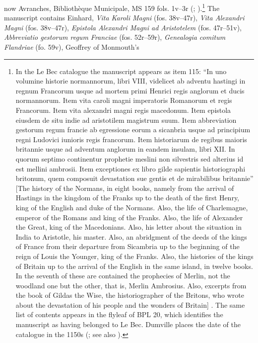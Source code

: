 \documentclass{article}
\begin{document}
now Avranches, Bibliothèque Municipale, MS 159 fols. 1v--3r (\cite[190--205]{pohl_monastic_2017}; \cite[2--4]{dumville_early_1985}).\footnote{In the Le Bec catalogue the
  manuscript appears as item 115: ``In uno volumine historie
  normannorum, libri VIII, videlicet ab adventu hastingi in regnum
  Francorum usque ad mortem primi Henrici regis anglorum et ducis
  normannorum. Item vita caroli magni imperatoris Romanorum et regis
  Francorum. Item vita alexandri magni regis macedonum. Item epistola
  eiusdem de situ indie ad aristotilem magistrum suum. Item abbreviation
  gestorum regum francie ab egressione eorum a sicanbria usque ad
  principium regni Ludovici iunioris regis francorum. Item historiarum
  de regibus maioris britannie usque ad adventum anglorum in eandem
  insulam, libri XII. In quorum septimo continentur prophetie meslini
  non silvestris sed alterius id est mellini ambrosii. Item exceptiones
  ex libro gilde sapientis historiographi britonum, quem composuit
  devastation sue gentis et de mirabilibus britannie'' [The history of the Normans, in eight books, namely from the arrival of Hastings in the kingdom of the Franks up to the death of the first Henry, king of the English and duke of the Normans. Also, the life of Charlemagne, emperor of the Romans and king of the Franks. Also, the life of Alexander the Great, king of the Macedonians. Also, his letter about the situation in India to Aristotle, his master. Also, an abridgment of the deeds of the kings of France from their departure from Sicambria up to the beginning of the reign of Louis the Younger, king of the Franks. Also, the histories of the kings of Britain up to the arrival of the English in the same island, in twelve books. In the seventh of these are contained the prophecies of Merlin, not the woodland one but the other, that is, Merlin Ambrosius. Also, excerpts from the book of Gildas the Wise, the historiographer of the Britons, who wrote about the devastation of his people and the wonders of Britain] \citep[203; my translation]{pohl_monastic_2017}. The same list of contents appears in the flyleaf of BPL 20,
  which identifies the manuscript as having belonged to Le Bec. Dumville
  places the date of the catalogue in the 1150s (\cite[3]{dumville_early_1985}; see
  also \cite[45--47]{rouse_potens_1991}).} The manuscript contains Einhard,
\emph{Vita Karoli Magni} (fos. 38v--47r), \emph{Vita Alexandri Magni}
(fos. 38v--47r), \emph{Epistola Alexandri Magni ad Aristotelem} (fos.
47r--51v), \emph{Abbreviatio gestorum regum Franciae} (fos. 52r--59r),
\emph{Genealogia comitum Flandriae} (fo. 59v), Geoffrey of Monmouth's
\end{document}
